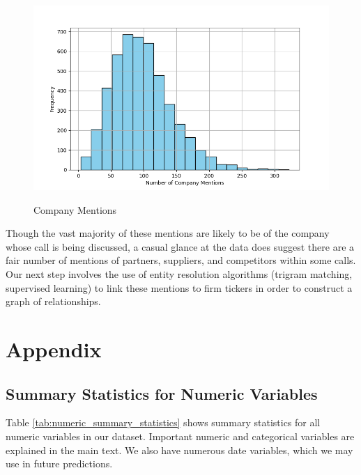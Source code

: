 \documentclass{article}[11pt]
\begin{document}
    \begin{figure}[h!]
		\centering
        \caption{Company Mentions}
        \includegraphics[width=0.6\linewidth,keepaspectratio=true]{../Output/All Data EDA/NLP EDA - NER on Company Names/Company Mentions Distribution No Title.png}
        \label{fig:company-mentions}
	\end{figure}

    Though the vast majority of these mentions are likely to be of the company whose call is being discussed, a casual glance at the data does suggest there are a fair number of mentions of partners, suppliers, and competitors within some calls. Our next step involves the use of entity resolution algorithms (trigram matching, supervised learning) to link these mentions to firm tickers in order to construct a graph of relationships.
    
    \clearpage
    \newpage

    
    

    \clearpage
    \newpage

    \appendix

    \section{Appendix}

    \subsection{Summary Statistics for Numeric Variables}

    Table \ref{tab:numeric_summary_statistics} shows summary statistics for all numeric variables in our dataset. Important numeric and categorical variables are explained in the main text. We also have numerous date variables, which we may use in future predictions.

    
\end{document}
